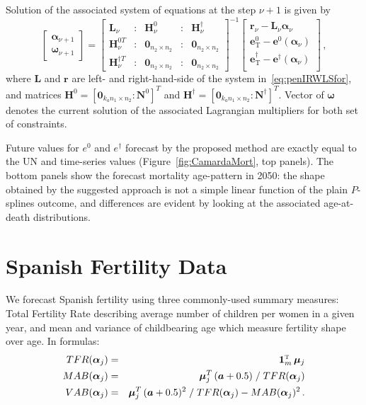 \documentclass[twoside]{report}
\begin{document}
Solution of the associated system of equations at the step $\nu + 1$ is given by
\begin{equation}\label{eq:SQLalg}
\left[ \begin{array}{l}
\bm{\alpha}_{\nu+1}\\
\bm{\omega}_{\nu+1}
\end{array}\right] = 
\left[ \begin{array}{lllll}
\bm{L}_{\nu}  &:& \bm{H}^{0}_{\nu} &:& \bm{H}^{\dagger}_{\nu}\\
\bm{H}_{\nu}^{0 T}  &:& \bm{0}_{n_{2} \times n_{2}}&:&\bm{0}_{n_{2} \times n_{2}}\\
\bm{H}_{\nu}^{\dagger T} &:& \bm{0}_{n_{2} \times n_{2}} &:& \bm{0}_{n_{2} \times n_{2}}
\end{array}\right]^{-1}
\left[ \begin{array}{c}
\bm{r}_{\nu} - \bm{L}_{\nu}\bm{\alpha}_{\nu}\\
\bm{e}^{0}_{\mathrm{T}} - \bm{e}^{0} (\bm{\alpha}_{\nu})\\
\bm{e}^{\dagger}_{\mathrm{T}} - \bm{e}^{\dagger} (\bm{\alpha}_{\nu})\\
\end{array}\right] \, ,
\end{equation}
where $\bm{L}$ and $\bm{r}$ are left- and right-hand-side of the system in~\eqref{eq:penIRWLSfor}, and matrices $\bm{H}^{0} = \left[\bm{0}_{k_{a}n_{1}\times n_{2}}:\bm{N}^{0} \right]^{T}$ and $\bm{H}^{\dagger} = \left[\bm{0}_{k_{a}n_{1}\times n_{2}}:\bm{N}^{\dagger} \right]^{T}$. Vector of $\bm{\omega}$ denotes the current solution of the associated Lagrangian multipliers for both set of constraints.

Future values for $e^{0}$ and $e^{\dagger}$ forecast by the proposed method are exactly equal to the UN and time-series values (Figure~\ref{fig:CamardaMort}, top panels). The bottom panels show the forecast mortality age-pattern in 2050: the shape obtained by the suggested approach is not a simple linear function of the plain $P$-splines outcome, and differences are evident by looking at the associated age-at-death distributions. 

\section{Spanish Fertility Data}

We forecast Spanish fertility using three commonly-used summary measures: Total Fertility Rate describing average number of children per women in a given year, and mean and variance of childbearing age which measure fertility shape over age. In formulas:
\begin{eqnarray}\label{eq:FertMea}
TFR(\bm{\alpha}_{j}) &=& \bm{1}_{m}^{\T} \, \bm{\mu}_{j}\\
MAB(\bm{\alpha}_{j}) &=& \bm{\mu}_{j}^{T} \, (\bm{a}+0.5) \; / \; TFR(\bm{\alpha}_{j})\nonumber\\
VAB(\bm{\alpha}_{j}) &=& \bm{\mu}_{j}^{T} \, (\bm{a}+0.5)^2 \; / \; TFR(\bm{\alpha}_{j}) - MAB(\bm{\alpha}_{j})^2\nonumber \, .
\end{eqnarray} 
\end{document}
